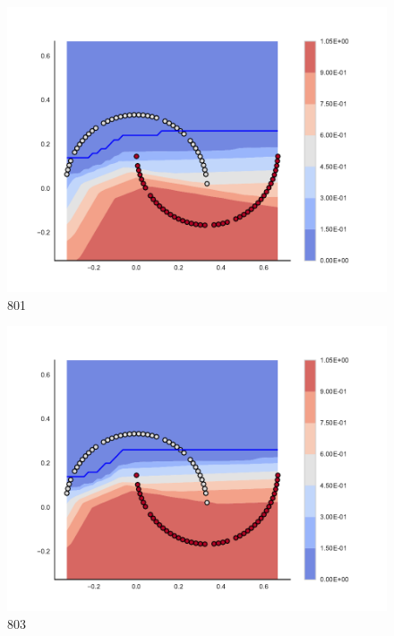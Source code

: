 \begin{subfigure}[b]{0.09\textwidth}
    \includegraphics[clip, trim=2.35cm 1.75cm 4.5cm 0cm,width=\textwidth]{img/convergence/801.pdf}
    \caption{801}
    \label{fig:convergence_801}
\end{subfigure}
%
\begin{subfigure}[b]{0.09\textwidth}
    \includegraphics[clip, trim=2.35cm 1.75cm 4.5cm 0cm,width=\textwidth]{img/convergence/803.pdf}
    \caption{803}
    \label{fig:convergence_803}
\end{subfigure}
%
